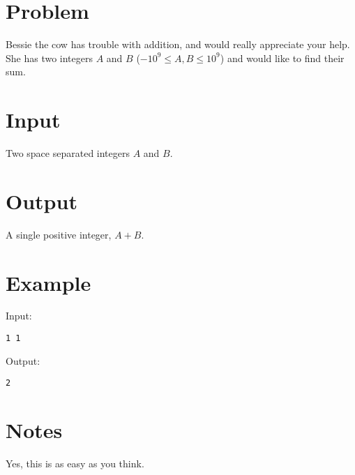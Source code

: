 \documentclass[11pt]{article}
\begin{document}
\section*{Problem}
Bessie the cow has trouble with addition, and would really appreciate your help. She has two integers $A$ and $B$ ($-10^9 \le A, B \le 10^9$) and would like to find their sum.
\section*{Input}
Two space separated integers $A$ and $B$.
\section*{Output}
A single positive integer, $A + B$.
\section*{Example}
Input:

\begin{verbatim}
1 1
\end{verbatim}

\noindent Output:

\begin{verbatim}
2
\end{verbatim}

\section*{Notes}
Yes, this is as easy as you think.
\end{document}
